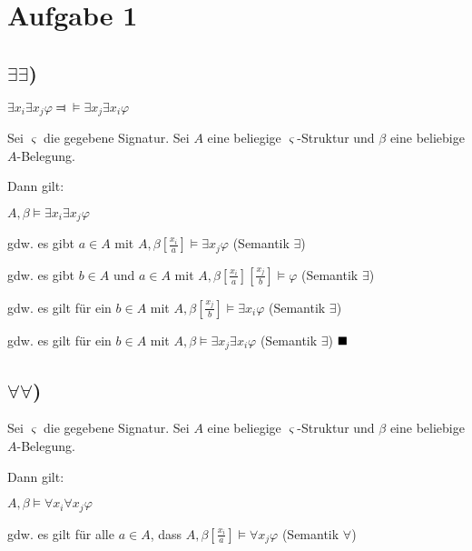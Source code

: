 \section*{Aufgabe 1}

\subsection*{$\exists \exists$)}

$\exists x_i \exists x_j \varphi \Dashv \vDash \exists x_j \exists x_i \varphi$

\hfill

Sei $\varsigma$ die gegebene Signatur. Sei $A$ eine beliegige $\varsigma$-Struktur und $\beta$ eine beliebige $A$-Belegung.

Dann gilt:

\hfill

$A,\beta \vDash \exists x_i \exists x_j \varphi$

\hfill

gdw. es gibt $a\in A$ mit $A,\beta [\frac{x_i}{a}]\vDash \exists x_j \varphi$ (Semantik $\exists $)

\hfill

gdw. es gibt $b\in A$ und $a\in A$ mit $A,\beta [\frac{x_i}{a}][\frac{x_j}{b}]\vDash \varphi$ (Semantik $\exists$)

\hfill

gdw. es gilt für ein $b\in A$ mit $A,\beta [\frac{x_j}{b}]\vDash \exists x_i \varphi$ (Semantik $\exists$)

\hfill

gdw. es gilt für ein $b\in A$ mit $A,\beta \vDash \exists x_j \exists x_i \varphi$ (Semantik $\exists$) $\\\blacksquare$

\subsection*{$\forall \forall$)}
Sei $\varsigma$ die gegebene Signatur. Sei $A$ eine beliegige $\varsigma$-Struktur und $\beta$ eine beliebige $A$-Belegung.

Dann gilt:

\hfill

$A,\beta \vDash \forall x_i \forall x_j \varphi$

\hfill

gdw. es gilt für alle $a\in A$, dass $A,\beta[\frac{x_i}{a}] \vDash \forall x_j \varphi$ (Semantik $\forall$)

\hfill

